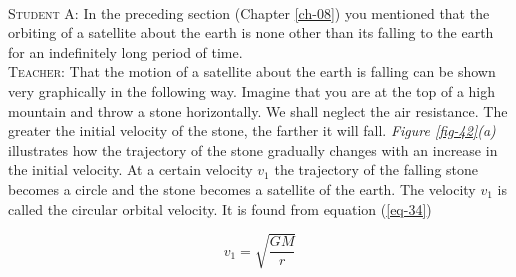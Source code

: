 \documentclass[a4paper,sfsidenotes]{tufte-book}
\begin{document}
\\
\textsc{Student A:} In the preceding section (Chapter \ref{ch-08}) you mentioned that the orbiting of a satellite about the earth is none other than its falling to the earth for an indefinitely long period of time.
\\
\textsc{Teacher:} That the motion of a satellite about the earth is falling can be shown very graphically in the following way. Imagine that you are at the top of a high mountain and throw a stone horizontally. We shall neglect the air resistance. The greater the initial velocity of the stone, the farther it will fall. \emph{Figure \ref{fig-42}(a)} illustrates how the trajectory of the stone gradually changes with an increase in the initial velocity. At a certain velocity $v_{1}$ the trajectory of the falling stone becomes a circle and the stone becomes a satellite of the earth. The velocity $v_{1}$ is called the circular orbital velocity. It is found from equation (\ref{eq-34})

\begin{equation} 
v_{1} = \sqrt{\frac{GM}{r}}
\label{eq-47}
\end{equation}
\end{document}
